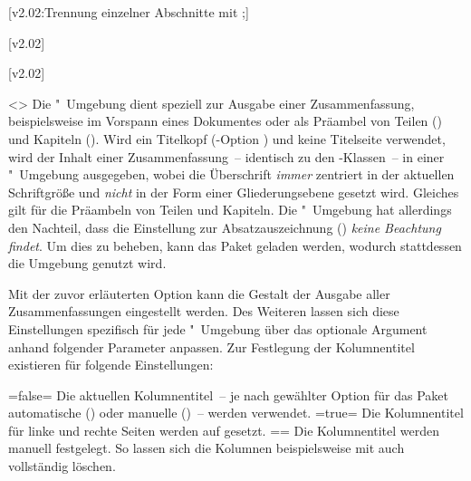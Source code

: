 \begin{DeclareEntity*}{}
\begin{DeclareEntity*}{}
\begin{DeclareEntity*}{}
\begin{Declaration}
  {}
  [v2.02:Trennung einzelner Abschnitte mit ;]
\begin{Declaration}
  {}
\begin{Declaration}
  {}
\begin{Declaration}
  {}
  [v2.02]
\begin{Declaration}
  {}
  [v2.02]
\begin{Declaration}
  {}
\begin{Declaration}
  {}
  <>
Die "~Umgebung dient speziell zur Ausgabe einer 
Zusammenfassung, beispielsweise im Vorspann eines Dokumentes oder als Präambel 
von Teilen () und Kapiteln (). 
Wird ein Titelkopf (\KOMAScript-Option ) und keine 
Titelseite verwendet, wird der Inhalt einer Zusammenfassung~-- identisch zu den 
\KOMAScript-Klassen~-- in einer "~Umgebung ausgegeben, 
wobei die Überschrift \emph{immer} zentriert in der aktuellen Schriftgröße und 
\emph{nicht} in der Form einer Gliederungsebene gesetzt wird. Gleiches gilt für 
die Präambeln von Teilen und Kapiteln. Die "~Umgebung 
hat allerdings den Nachteil, dass die Einstellung zur Absatzauszeichnung 
() \emph{keine Beachtung findet}. Um dies zu beheben, 
kann das Paket  geladen werden, wodurch stattdessen die 
Umgebung  genutzt wird.

Mit der zuvor erläuterten Option  kann die Gestalt der Ausgabe 
aller Zusammenfassungen eingestellt werden. Des Weiteren lassen sich diese  
Einstellungen spezifisch für jede "~Umgebung über das 
optionale Argument anhand folgender Parameter anpassen. 
%
%
Zur Festlegung der Kolumnentitel existieren für  
folgende Einstellungen:
\begin{DeclareValues}
\itemval=false=
  Die aktuellen Kolumnentitel~-- je nach gewählter Option für das Paket 
   automatische () oder manuelle 
  ()~-- werden verwendet.
\itemval*=true=
  Die Kolumnentitel für linke und rechte Seiten werden auf  
  gesetzt.
\itemval==
  Die Kolumnentitel werden manuell festgelegt. So lassen sich die Kolumnen  
  beispielsweise mit  auch 
  vollständig löschen. 
\end{DeclareValues}


\end{Declaration}
\end{Declaration}
\end{Declaration}
\end{Declaration}
\end{Declaration}
\end{Declaration}
\end{Declaration}
\end{DeclareEntity*}
\end{DeclareEntity*}
\end{DeclareEntity*}
